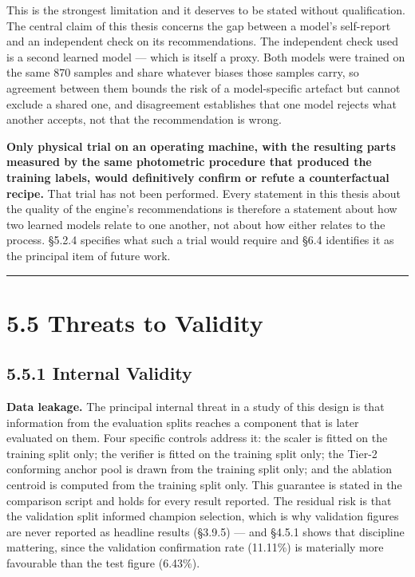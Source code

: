 This is the strongest limitation and it deserves to be stated without qualification. The central claim of this thesis concerns the gap between a model's self-report and an independent check on its recommendations. The independent check used is a second learned model --- which is itself a proxy. Both models were trained on the same 870 samples and share whatever biases those samples carry, so agreement between them bounds the risk of a model-specific artefact but cannot exclude a shared one, and disagreement establishes that one model rejects what another accepts, not that the recommendation is wrong.

\textbf{Only physical trial on an operating machine, with the resulting parts measured by the same photometric procedure that produced the training labels, would definitively confirm or refute a counterfactual recipe.} That trial has not been performed. Every statement in this thesis about the quality of the engine's recommendations is therefore a statement about how two learned models relate to one another, not about how either relates to the process. §5.2.4 specifies what such a trial would require and §6.4 identifies it as the principal item of future work.

\begin{center}\rule{0.5\linewidth}{0.5pt}\end{center}

\hypertarget{threats-to-validity}{%
\section{5.5 Threats to Validity}\label{threats-to-validity}}

\hypertarget{internal-validity}{%
\subsection{5.5.1 Internal Validity}\label{internal-validity}}

\textbf{Data leakage.} The principal internal threat in a study of this design is that information from the evaluation splits reaches a component that is later evaluated on them. Four specific controls address it: the scaler is fitted on the training split only; the verifier is fitted on the training split only; the Tier-2 conforming anchor pool is drawn from the training split only; and the ablation centroid is computed from the training split only. This guarantee is stated in the comparison script and holds for every result reported. The residual risk is that the validation split informed champion selection, which is why validation figures are never reported as headline results (§3.9.5) --- and §4.5.1 shows that discipline mattering, since the validation confirmation rate (11.11\%) is materially more favourable than the test figure (6.43\%).

